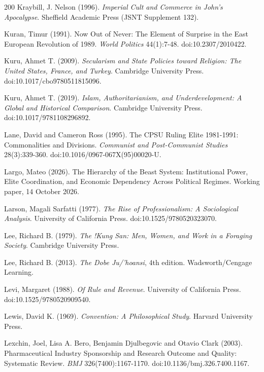 \documentclass[11pt,letterpaper]{article}
\theoremstyle{definition}
\theoremstyle{remark}
\begin{document}
\begin{thebibliography}{200}
Kraybill, J. Nelson (1996). \emph{Imperial Cult and Commerce in John's Apocalypse}. Sheffield Academic Press (JSNT Supplement 132).

Kuran, Timur (1991). Now Out of Never: The Element of Surprise in the East European Revolution of 1989. \emph{World Politics} 44(1):7-48. doi:10.2307/2010422.

Kuru, Ahmet T. (2009). \emph{Secularism and State Policies toward Religion: The United States, France, and Turkey}. Cambridge University Press. doi:10.1017/cbo9780511815096.

Kuru, Ahmet T. (2019). \emph{Islam, Authoritarianism, and Underdevelopment: A Global and Historical Comparison}. Cambridge University Press. doi:10.1017/9781108296892.

Lane, David and Cameron Ross (1995). The CPSU Ruling Elite 1981-1991: Commonalities and Divisions. \emph{Communist and Post-Communist Studies} 28(3):339-360. doi:10.1016/0967-067X(95)00020-U.

Largo, Mateo (2026). The Hierarchy of the Beast System: Institutional Power, Elite Coordination, and Economic Dependency Across Political Regimes. Working paper, 14 October 2026.

Larson, Magali Sarfatti (1977). \emph{The Rise of Professionalism: A Sociological Analysis}. University of California Press. doi:10.1525/9780520323070.

Lee, Richard B. (1979). \emph{The !Kung San: Men, Women, and Work in a Foraging Society}. Cambridge University Press.

Lee, Richard B. (2013). \emph{The Dobe Ju/'hoansi}, 4th edition. Wadsworth/Cengage Learning.

Levi, Margaret (1988). \emph{Of Rule and Revenue}. University of California Press. doi:10.1525/9780520909540.

Lewis, David K. (1969). \emph{Convention: A Philosophical Study}. Harvard University Press.

Lexchin, Joel, Lisa A. Bero, Benjamin Djulbegovic and Otavio Clark (2003). Pharmaceutical Industry Sponsorship and Research Outcome and Quality: Systematic Review. \emph{BMJ} 326(7400):1167-1170. doi:10.1136/bmj.326.7400.1167.


\end{thebibliography}
\end{document}
